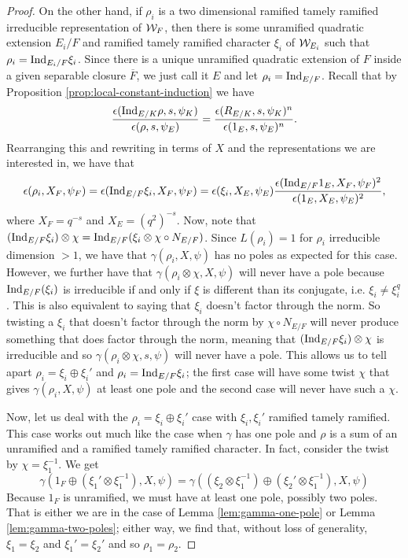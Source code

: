 \begin{proof}
  On the other hand, if $\rho_i$ is a two dimensional ramified tamely ramified irreducible representation of $\mathcal{W}_F$, then there is some unramified quadratic extension $E_i/F$ and ramified tamely ramified character $\xi_i$ of $\mathcal{W}_{E_i}$ such that $\rho_i = \textrm{Ind}_{E_i/F} \xi_i$.
  Since there is a unique unramified quadratic extension of $F$ inside a given separable closure $\overline{F}$, we just call it $E$ and let $\rho_i = \textrm{Ind}_{E/F}$.
  Recall that by Proposition \ref{prop:local-constant-induction} we have
  \[\frac{\epsilon(\textrm{Ind}_{E/K} \rho, s, \psi_K)}{\epsilon(\rho,s,\psi_E)} = \frac{\epsilon(R_{E/K},s,\psi_K)^n}{\epsilon(1_E,s,\psi_E)^n}.\]
  Rearranging this and rewriting in terms of $X$ and the representations we are interested in, we have that
  \[\epsilon(\rho_i,X_F,\psi_F) = \epsilon(\textrm{Ind}_{E/F} \xi_i, X_F, \psi_F) = \epsilon(\xi_i, X_E, \psi_E) \frac{\epsilon(\textrm{Ind}_{E/F} 1_E,X_F,\psi_F)^2}{\epsilon(1_E,X_E,\psi_E)^2},\]
  where $X_F = q^{-s}$ and $X_E = (q^2)^{-s}$.
  Now, note that $(\textrm{Ind}_{E/F} \xi_i )\otimes \chi = \textrm{Ind}_{E/F} (\xi_i \otimes \chi \circ N_{E/F})$.
  Since $L(\rho_i) = 1$ for $\rho_i$ irreducible dimension $ > 1$, we have that $\gamma(\rho_i,X,\psi)$ has no poles as expected for this case.
  However, we further have that $\gamma(\rho_i \otimes \chi,X,\psi)$ will never have a pole because $\textrm{Ind}_{E/F} (\xi_i)$ is irreducible if and only if $\xi$ is different than its conjugate, i.e.  $\xi_i \neq \xi_i^{q}$.
  This is also equivalent to saying that $\xi_i$ doesn't factor through the norm.
  So twisting a $\xi_i$ that doesn't factor through the norm by $\chi \circ N_{E/F}$ will never produce something that does factor through the norm, meaning that $(\textrm{Ind}_{E/F} \xi_i )\otimes \chi$ is irreducible and so $\gamma(\rho_i \otimes \chi, s, \psi)$ will never have a pole.
  This allows us to tell apart $\rho_i = \xi_i \oplus \xi_i'$ and $\rho_i = \textrm{Ind}_{E/F} \xi_i$; the first case will have some twist $\chi$ that gives $\gamma(\rho_i,X,\psi)$ at least one pole and the second case will never have such a $\chi$.

  
  Now, let us deal with the $\rho_i = \xi_i \oplus \xi_i'$ case with $\xi_i, \xi_i'$ ramified tamely ramified.
  This case works out much like the case when $\gamma$ has one pole and $\rho$ is a sum of an unramified and a ramified tamely ramified character.
  In fact, consider the twist by $\chi = \xi_1^{-1}$.
  We get \[\gamma(1_F \oplus (\xi_1' \otimes \xi_1^{-1}),X,\psi) = \gamma((\xi_2 \otimes \xi_1^{-1})\oplus(\xi_2' \otimes \xi_1^{-1}),X,\psi)\]
  Because $1_F$ is unramified, we must have at least one pole, possibly two poles.
  That is either we are in the case of Lemma \ref{lem:gamma-one-pole} or Lemma \ref{lem:gamma-two-poles}; either way, we find that, without loss of generality, $\xi_1 = \xi_2$ and $\xi_1' = \xi_2'$ and so $\rho_1 = \rho_2$.
  

\end{proof}
